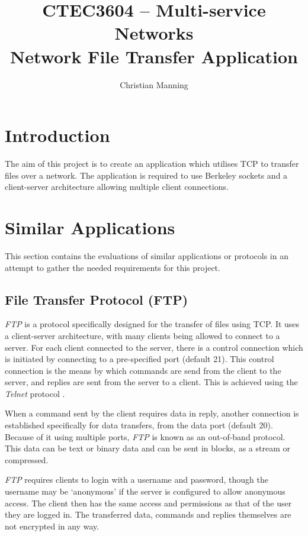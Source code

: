 \documentclass[a4paper]{article}
\title{CTEC3604 -- Multi-service Networks\\
Network File Transfer Application}
\author{Christian Manning}
\begin{document}
\maketitle

\tableofcontents

\pagebreak

\section{Introduction}

The aim of this project is to create an application which utilises TCP to transfer files over a network. The application is required to use Berkeley sockets and a client-server architecture allowing multiple client connections.


\section{Similar Applications}

This section contains the evaluations of similar applications or protocols in an attempt to gather the needed requirements for this project.

\subsection{File Transfer Protocol (FTP)}

\textit{FTP} \cite{rfc959} is a protocol specifically designed for the transfer of files using TCP. It uses a client-server architecture, with many clients being allowed to connect to a server. For each client connected to the server, there is a control connection which is initiated by connecting to a pre-specified port (default 21). This control connection is the means by which commands are send from the client to the server, and replies are sent from the server to a client. This is achieved using the \textit{Telnet} protocol \cite{rfc854}.

When a command sent by the client requires data in reply, another connection is established specifically for data transfers, from the data port (default 20). Because of it using multiple ports, \textit{FTP} is known as an out-of-band protocol. This data can be text or binary data and can be sent in blocks, as a stream or compressed.

\textit{FTP} requires clients to login with a username and password, though the username may be `anonymous' if the server is configured to allow anonymous access. The client then has the same access and permissions as that of the user they are logged in. The transferred data, commands and replies themselves are not encrypted in any way.
\end{document}
